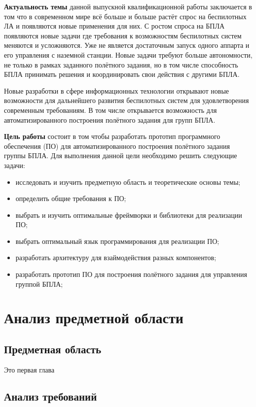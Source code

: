 \documentclass{itmo-student-thesis}
\begin{document}
\textbf{Актуальность темы} данной выпускной квалификационной работы
заключается в том что в современном мире всё больше и больше растёт спрос на
беспилотных ЛА и появляются новые применения для них. С ростом спроса на БПЛА
появляются новые задачи где требования к возможностям беспилотных систем
меняются и усложняются. Уже не является достаточным запуск одного аппарта и его
управления с наземной станции. Новые задачи требуют больше автономности, не
только в рамках заданного полётного задания, но в том числе способность БПЛА
принимать решения и координировать свои действия с другими БПЛА.

Новые разработки в сфере информационных технологии открывают новые возможности
для дальнейшего развития беспилотных систем для удовлетворения современным
требованиям. В том числе открывается возможность для автоматизированного
построения полётного задания для групп БПЛА.

\textbf{Цель работы} состоит в том чтобы разработать прототип программного
обеспечения (ПО) для автоматизированного построения полётного задания группы
БПЛА. Для выполнения данной цели необходимо решить следующие задачи:

\begin{itemize}
  \item исследовать и изучить предметную область и теоретические основы темы;
  \item определить общие требования к ПО;
  \item выбрать и изучить оптимальные фреймворки и библиотеки для реализации ПО;
  \item выбрать оптимальный язык программирования для реализации ПО;
  \item разработать архитектуру для взаймодействия разных компонентов;
  \item разработать прототип ПО для построения полётного задания для управления
    группой БПЛА;
\end{itemize}

\chapter{Анализ предметной области}

\section{Предметная область}

Это первая глава

\section{Анализ требований}
\end{document}
